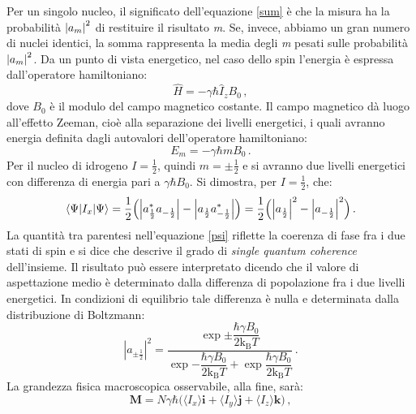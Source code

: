 \documentclass{report}
\renewcommand{\eqref}[1]{equazione \ref{#1}}
\numberwithin{equation}{section}
\numberwithin{figure}{section}
\renewcommand{\Vec}{\bm}
\begin{document}
\noindent Per un singolo nucleo, il significato dell'\eqref{sum} è che la misura ha la probabilità $\abs{a_m}^2$ di restituire il risultato \textit{m}. Se, invece, abbiamo un gran numero di nuclei identici, la somma rappresenta la media degli \textit{m} pesati sulle probabilità $\abs{a_m}^2$. Da un punto di vista energetico, nel caso dello spin l'energia è espressa dall'operatore hamiltoniano:
\vspace{4 pt}
\begin{equation}
    \hat{H}=-\gamma \hbar \hat{I}_z B_0\,,
    \label{h}
\end{equation}
dove $B_0$ è il modulo del campo magnetico costante. Il campo magnetico dà luogo all'effetto Zeeman, cioè alla separazione dei livelli energetici, i quali avranno energia definita dagli autovalori dell'operatore hamiltoniano:
\vspace{4 pt}
\begin{equation}
    E_m=-\gamma \hbar m B_0\,.
\end{equation}
Per il nucleo di idrogeno $I=\frac{1}{2}$, quindi $m=\pm \frac{1}{2}$ e si avranno due livelli energetici con differenza di energia pari a $\gamma \hbar B_0$. Si dimostra, per $I=\frac{1}{2}$, che:
\begin{equation}
    \langle \Psi|I_x|\Psi \rangle=\frac{1}{2} \Big(\abs{a_{\frac{1}{2}}^* a_{-\frac{1}{2}}}-\abs{a_{\frac{1}{2}} a_{-\frac{1}{2}}^*} \Big)= \frac{1}{2} \Big(\abs{a_{\frac{1}{2}}}^2-\abs{a_{-\frac{1}{2}}}^2 \Big)\,.
    \label{psi}
\end{equation}
La quantità tra parentesi nell'\eqref{psi} riflette la coerenza di fase fra i due stati di spin e si dice che descrive il grado di \textit{single quantum coherence} dell'insieme. Il risultato può essere interpretato dicendo che il valore di aspettazione medio è determinato dalla differenza di popolazione fra i due livelli energetici. In condizioni di equilibrio tale differenza è nulla e determinata dalla distribuzione di Boltzmann:
\begin{equation}
    |a_{\pm \frac{1}{2}}|^2 = \frac{\exp{\pm \dfrac{\hbar \gamma B_0}{2\mathrm{k_B}T}}}{\exp{-\dfrac{\hbar \gamma B_0}{2\mathrm{k_B}T}}+\exp{\dfrac{\hbar \gamma B_0}{2\mathrm{k_B}T}}}\,.
\end{equation}
La grandezza fisica macroscopica osservabile, alla fine, sarà:
\begin{equation}
    \Vec{M}=N \gamma \hbar \big( \langle I_x \rangle \Vec{i} + \langle I_y \rangle \Vec{j} + \langle I_z \rangle \Vec{k} \big)\,,
\end{equation}
\end{document}
